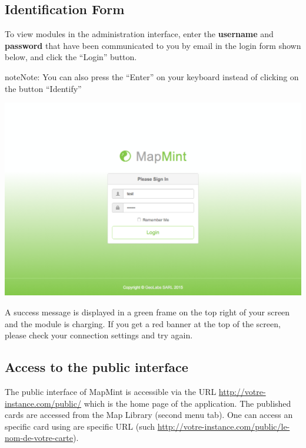 \documentclass[letterpaper,10pt,english]{sphinxmanual}
\begin{document}
\subsection{Identification Form}
\label{introduction/usemapmint:formulaire-d-identification}
To view modules in the administration interface, enter the \textbf{username} and \textbf{password} that have been communicated to you by email in the login form shown below, and click the ``Login'' button.

\begin{notice}{note}{Note:}
You can also press the ``Enter'' on your keyboard instead of clicking on the button ``Identify''
\end{notice}

\includegraphics{login-screen.png}

A success message is displayed in a green frame on the top right of your screen and the module is charging. If you get a red banner at the top of the screen, please check your connection settings and try again.


\subsection{Access to the public interface}
\label{introduction/usemapmint:introduction-usemapmint-public-access}\label{introduction/usemapmint:acces-a-l-interface-publique}
The public interface of MapMint is accessible via the URL \href{http://votre-instance.com/public/}{http://votre-instance.com/public/} which is the home page of the application. The published cards are accessed from the Map Library (second menu tab). One can access an specific card using are specific URL (such \href{http://votre-instance.com/public/le-nom-de-votre-carte}{http://votre-instance.com/public/le-nom-de-votre-carte}).
\end{document}
